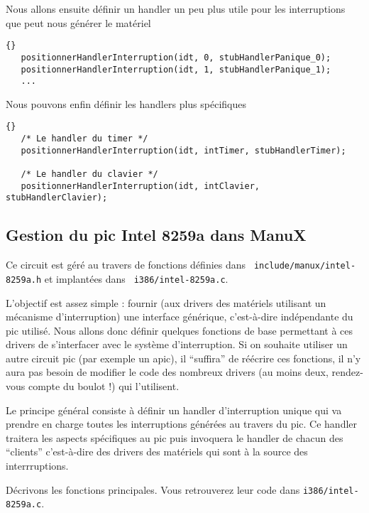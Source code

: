 \begin{itemize}
   Nous allons ensuite définir un handler un peu plus utile pour les
interruptions que peut nous générer le matériel

\begin{lstlisting}{}
   positionnerHandlerInterruption(idt, 0, stubHandlerPanique_0);
   positionnerHandlerInterruption(idt, 1, stubHandlerPanique_1);
   ...
\end{lstlisting}
   
   Nous pouvons enfin définir les handlers plus spécifiques

\begin{lstlisting}{}
   /* Le handler du timer */
   positionnerHandlerInterruption(idt, intTimer, stubHandlerTimer);

   /* Le handler du clavier */
   positionnerHandlerInterruption(idt, intClavier, stubHandlerClavier);
\end{lstlisting}

%
\subsection{Gestion du {\sc pic} Intel 8259a dans ManuX}

   Ce circuit est géré au travers de fonctions définies dans {\tt
include/manux/intel-8259a.h} et implantées dans {\tt
     i386/intel-8259a.c}.

   L'objectif est assez simple : fournir (aux drivers des matériels
utilisant un mécanisme d'interruption) une interface générique,
c'est-à-dire indépendante du {\sc pic} utilisé. Nous allons donc
définir quelques fonctions de base permettant à ces drivers de
s'interfacer avec le système d'interruption. Si on souhaite utiliser
un autre circuit {\sc pic} (par exemple un  {\sc apic}), il
``suffira'' de réécrire ces fonctions, il n'y aura pas besoin de
modifier le code des nombreux drivers (au moins deux, rendez-vous
compte du boulot !) qui l'utilisent.

   Le principe général consiste à définir un handler d'interruption
unique qui va prendre en charge toutes les interruptions générées au
travers du {\sc pic}. Ce handler traitera les aspects spécifiques au
{\sc pic} puis invoquera le handler de chacun des ``clients''
c'est-à-dire des drivers des matériels qui sont à la source des
interrruptions.

   Décrivons les fonctions principales. Vous retrouverez leur code
dans {\tt i386/intel-8259a.c}.


\end{itemize}
